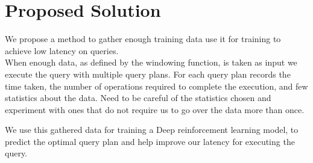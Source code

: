 \section{Proposed Solution}
We propose a method to gather enough training data use it for training to achieve low latency on queries.\\
When enough data, as defined by the windowing function, is taken as input we execute the query with multiple query plans. For each query plan records the time taken, the number of operations required to complete the execution, and few statistics about the data. Need to be careful of the statistics chosen and experiment with ones that do not require us to go over the data more than once.
\par We use this gathered data for training a Deep reinforcement learning model, to predict the optimal query plan and help improve our latency for executing the query.  


